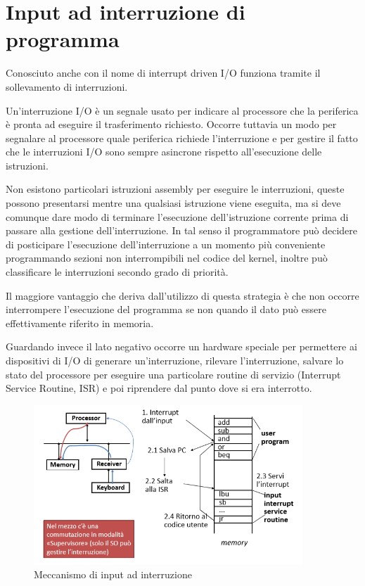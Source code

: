 \documentclass[class=book, crop=false, oneside]{standalone}
\begin{document}
\section{Input ad interruzione di programma}
Conosciuto anche con il nome di interrupt driven I/O funziona tramite il sollevamento di interruzioni.

Un’interruzione I/O è un segnale usato per indicare al processore che la periferica è pronta ad eseguire il trasferimento richiesto.
Occorre tuttavia un modo per segnalare al processore quale periferica richiede l’interruzione e per gestire il fatto che le interruzioni I/O sono sempre asincrone rispetto all’esecuzione delle istruzioni.

Non esistono particolari istruzioni assembly per eseguire le interruzioni, queste possono presentarsi mentre una qualsiasi istruzione viene eseguita, ma si deve comunque dare modo di terminare l’esecuzione dell’istruzione corrente prima di passare alla gestione dell'interruzione.
In tal senso il programmatore può decidere di posticipare l’esecuzione dell’interruzione a un momento più conveniente programmando sezioni non interrompibili nel codice del kernel, inoltre può classificare le interruzioni secondo grado di priorità.

Il maggiore vantaggio che deriva dall'utilizzo di questa strategia è che non occorre interrompere l’esecuzione del programma se non quando il dato può essere effettivamente riferito in memoria.

Guardando invece il lato negativo occorre un hardware speciale per permettere ai dispositivi di I/O di generare un’interruzione, rilevare l’interruzione, salvare lo stato del processore per eseguire una particolare routine di servizio (Interrupt Service Routine, ISR) e poi riprendere dal punto dove si era interrotto.

\begin{figure}[H]
	\centering
	\includegraphics[width=0.9\textwidth,keepaspectratio]{input-a-interruzione}
	\caption{Meccanismo di input ad interruzione}
\end{figure}
\end{document}
